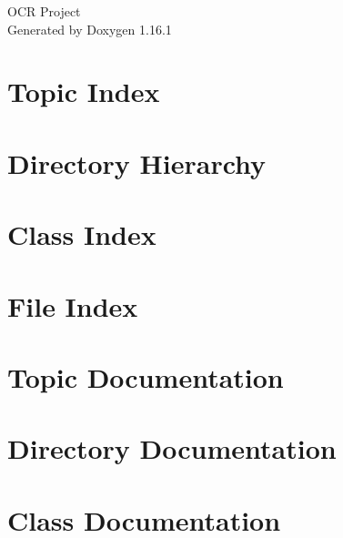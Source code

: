 \documentclass[twoside]{book}
\newcommand{\+}{\discretionary{\mbox{\scriptsize$\hookleftarrow$}}{}{}}
\newcommand{\clearemptydoublepage}{%
    \newpage{\pagestyle{empty}\cleardoublepage}%
  }
\begin{document}
  \raggedbottom
    \hypersetup{pageanchor=false,
                bookmarksnumbered=true,
                pdfencoding=unicode
               }
  \begin{titlepage}
  \vspace*{7cm}
  \begin{center}%
  {\Large OCR Project}\\
  \vspace*{1cm}
  {\large Generated by Doxygen 1.16.1}\\
  \end{center}
  \end{titlepage}
  \clearemptydoublepage
  \tableofcontents
  \clearemptydoublepage
  \hypersetup{pageanchor=true}
\chapter{Topic Index}

\chapter{Directory Hierarchy}

\chapter{Class Index}

\chapter{File Index}

\chapter{Topic Documentation}


\chapter{Directory Documentation}





\chapter{Class Documentation}
















\end{document}
